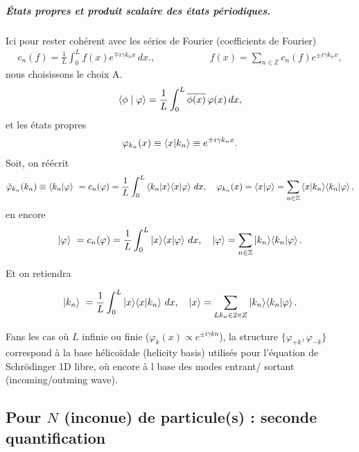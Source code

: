 \subparagraph{États propres et produit scalaire des états périodiques.}
Ici pour rester cohérent avec les séries de Fourier (coefficients de Fourier) 
\begin{eqnarray}
    c_n(f) = \frac{1}{L} \int_0^L f(x) e^{\mp i \gamma k_n x } \, dx., \qquad && \qquad f(x) = \sum_{n \in \mathbb Z } c_n(f) e^{\pm i \gamma k_n x  },
\end{eqnarray} 
nous  choisissons le choix A. 
\begin{eqnarray}
   \braket{ \phi \mid \varphi}
   =
    \frac{1}{L}\int_0^L \overline{\phi (x)}\,\varphi(x)\,dx,
\end{eqnarray}
et les états propres
\begin{eqnarray}
   \varphi_{k_n} (x) \equiv  \braket{x \vert k_n} \equiv e^{\pm i\gamma k_n x}.
\end{eqnarray}
Soit, on réécrit 
\begin{eqnarray}
    \tilde \varphi_{k_n} (k_n )\equiv \braket{ k_n \vert \varphi  } = c_n(\varphi) = \frac{1}{L} \int_0^L \braket{ k_n  \vert x  }\! \braket{x \vert \varphi}   \, dx, \quad   \varphi_{k_n} (x) = \braket{x \vert \varphi}  = \sum_{n \in \mathbb Z } \braket{x  \vert  k_n  }\! \braket{k_n \vert \varphi }  ,
\end{eqnarray} 
en encore 
\begin{eqnarray}
    \ket{\varphi  } = c_n(\varphi) = \frac{1}{L} \int_0^L  \ket{ x  } \!\braket{x \vert \varphi}  \, dx, \quad   \ket{\varphi}  = \sum_{n \in \mathbb Z } \ket{ k_n  }\! \braket{k_n \vert \varphi }  .
\end{eqnarray} 

Et on retiendra 

\begin{eqnarray}
    \ket{ k_n  } = \frac{1}{L} \int_0^L \ket{ x  } \! \braket{x \vert k_n}   \, dx, \quad   \ket{x}  = \sum_{ L k_n  \in 2 \pi  Z } \ket{ k_n  } \! \braket{k_n \vert \varphi } .
\end{eqnarray}

\begin{Rema} Fans les cas où $L$ infinie ou  finie ($\varphi_k(x) \propto  e^{\pm i \gamma k n }$), la structure $\{\varphi_{+k},\varphi_{-k}\}$ correspond à la base hélicoïdale (helicity basis) utilisés pour l'équation de Schrödinger 1D libre, où encore à l base des modes entrant/ sortant (\guillemotleft{}incoming/outming wave\guillemotright{}).
\end{Rema}

\subsection{Pour $N$ (inconue) de particule(s) : seconde quantification}

